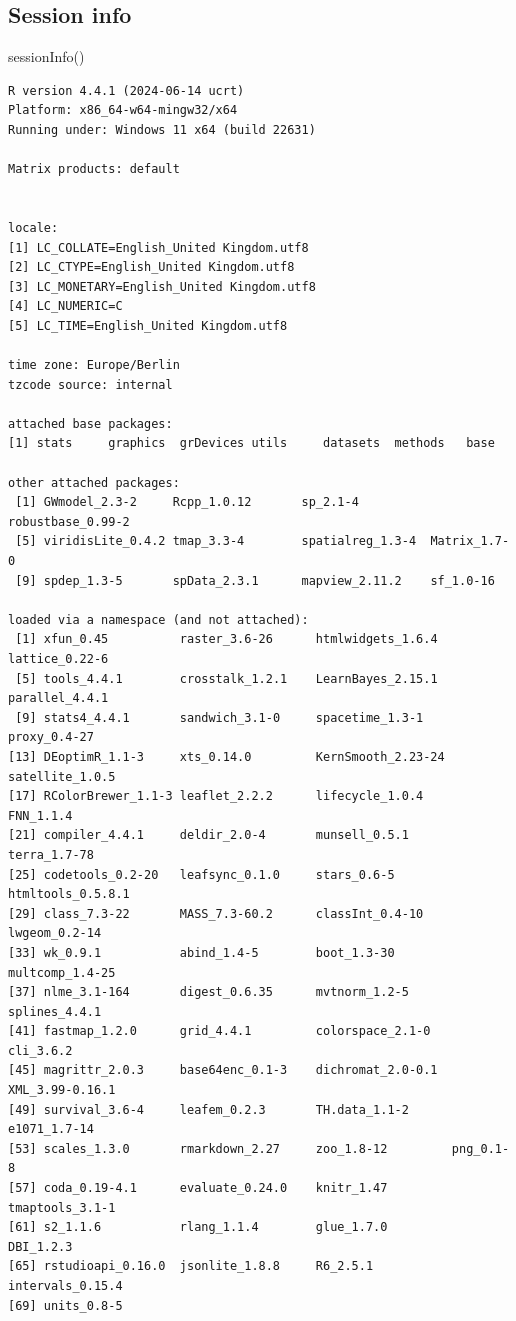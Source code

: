 \documentclass[
  letterpaper,
]{scrbook}
\newenvironment{Shaded}{\begin{snugshade}}{\end{snugshade}}
\newcommand{\FunctionTok}[1]{\textcolor[rgb]{0.28,0.35,0.67}{#1}}
\newcommand{\NormalTok}[1]{\textcolor[rgb]{0.00,0.23,0.31}{#1}}
\begin{document}
\hypertarget{session-info-12}{%
\subsection{Session info}\label{session-info-12}}

\begin{Shaded}
\begin{Highlighting}[]
\FunctionTok{sessionInfo}\NormalTok{()}
\end{Highlighting}
\end{Shaded}

\begin{verbatim}
R version 4.4.1 (2024-06-14 ucrt)
Platform: x86_64-w64-mingw32/x64
Running under: Windows 11 x64 (build 22631)

Matrix products: default


locale:
[1] LC_COLLATE=English_United Kingdom.utf8 
[2] LC_CTYPE=English_United Kingdom.utf8   
[3] LC_MONETARY=English_United Kingdom.utf8
[4] LC_NUMERIC=C                           
[5] LC_TIME=English_United Kingdom.utf8    

time zone: Europe/Berlin
tzcode source: internal

attached base packages:
[1] stats     graphics  grDevices utils     datasets  methods   base     

other attached packages:
 [1] GWmodel_2.3-2     Rcpp_1.0.12       sp_2.1-4          robustbase_0.99-2
 [5] viridisLite_0.4.2 tmap_3.3-4        spatialreg_1.3-4  Matrix_1.7-0     
 [9] spdep_1.3-5       spData_2.3.1      mapview_2.11.2    sf_1.0-16        

loaded via a namespace (and not attached):
 [1] xfun_0.45          raster_3.6-26      htmlwidgets_1.6.4  lattice_0.22-6    
 [5] tools_4.4.1        crosstalk_1.2.1    LearnBayes_2.15.1  parallel_4.4.1    
 [9] stats4_4.4.1       sandwich_3.1-0     spacetime_1.3-1    proxy_0.4-27      
[13] DEoptimR_1.1-3     xts_0.14.0         KernSmooth_2.23-24 satellite_1.0.5   
[17] RColorBrewer_1.1-3 leaflet_2.2.2      lifecycle_1.0.4    FNN_1.1.4         
[21] compiler_4.4.1     deldir_2.0-4       munsell_0.5.1      terra_1.7-78      
[25] codetools_0.2-20   leafsync_0.1.0     stars_0.6-5        htmltools_0.5.8.1 
[29] class_7.3-22       MASS_7.3-60.2      classInt_0.4-10    lwgeom_0.2-14     
[33] wk_0.9.1           abind_1.4-5        boot_1.3-30        multcomp_1.4-25   
[37] nlme_3.1-164       digest_0.6.35      mvtnorm_1.2-5      splines_4.4.1     
[41] fastmap_1.2.0      grid_4.4.1         colorspace_2.1-0   cli_3.6.2         
[45] magrittr_2.0.3     base64enc_0.1-3    dichromat_2.0-0.1  XML_3.99-0.16.1   
[49] survival_3.6-4     leafem_0.2.3       TH.data_1.1-2      e1071_1.7-14      
[53] scales_1.3.0       rmarkdown_2.27     zoo_1.8-12         png_0.1-8         
[57] coda_0.19-4.1      evaluate_0.24.0    knitr_1.47         tmaptools_3.1-1   
[61] s2_1.1.6           rlang_1.1.4        glue_1.7.0         DBI_1.2.3         
[65] rstudioapi_0.16.0  jsonlite_1.8.8     R6_2.5.1           intervals_0.15.4  
[69] units_0.8-5       
\end{verbatim}
\end{document}
